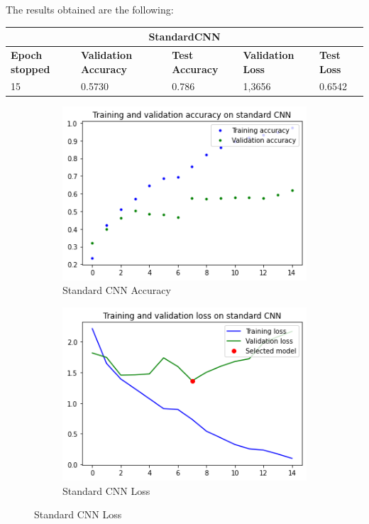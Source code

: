 \noindent The results obtained are the following:

\medskip

\begin{tabular}{ |p{2cm}|p{2cm}|p{2cm}|p{2cm}|p{2cm}|  }
\hline
\multicolumn{5}{|c|}{StandardCNN} \\
\hline
\textbf{Epoch stopped} & \textbf{Validation Accuracy} & \textbf{Test Accuracy} & \textbf{Validation Loss} & \textbf{Test Loss} \\
\hline
15 & 0.5730 & 0.786 & 1,3656 & 0.6542\\
\hline
\end{tabular}

\medskip


\begin{figure}[H]
	\begin{subfigure}{0.5\textwidth}
		\includegraphics[width=0.9\linewidth]{img/scratch/standardCNN_results_accuracy.png} 
		\caption{Standard CNN Accuracy}
		\label{fig:standardCNNacc}
	\end{subfigure}
	\begin{subfigure}{0.5\textwidth}
		\includegraphics[width=0.9\linewidth]{img/scratch/standardCNN_results_loss.png}
		\caption{Standard CNN Loss}
		\label{fig:standardCNNloss}
	\end{subfigure}
\end{figure}

